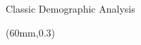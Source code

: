 \documentclass[10pt]{beamer}
\begin{document}
\begin{frame}[t]{Classic Demographic Analysis}
\begin{textblock*}{62mm}(60mm,0.3\textheight)
\end{textblock*}
\end{frame}
\end{document}
